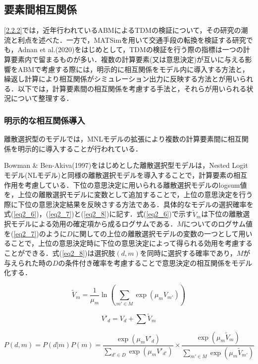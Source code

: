 \subsection{要素間相互関係}\label{2.2.3}

\ref{2.2.2}では，近年行われているABMによるTDMの検証について，その研究の潮流と利点を述べた．一方で，MATSimを用いて交通手段の転換を検証する研究でも，Adnan et al.(2020)をはじめとして，TDMの検証を行う際の指標は一つの計算要素内で留まるものが多い．複数の計算要素(又は意思決定)が互いに与える影響をABMで考慮する際には，明示的に相互関係をモデル内に導入する方法と，繰返し計算により相互関係がシミュレーション出力に反映する方法とが用いられる．以下では，計算要素間の相互関係を考慮する手法と，それらが用いられる状況について整理する．  

\subsubsection{明示的な相互関係導入}
離散選択型のモデルでは，MNLモデルの拡張により複数の計算要素間に相互関係を明示的に導入することが行われている．

Bowman \& Ben-Akiva(1997)をはじめとした離散選択型モデルは，Nested Logit モデル(NLモデル)と同様の離散選択モデルを導入することで，計算要素の相互作用を考慮している．下位の意思決定に用いられる離散選択モデルのlogsum値を，上位の離散選択モデルに変数として追加することで，上位の意思決定を行う際に下位の意思決定結果を反映さする方法である．具体的なモデルの選択確率を式(\ref{eq2_6})，(\ref{eq2_7})と(\ref{eq2_8})に記す．式(\ref{eq2_6})で示す$\tilde{V}_{m}$は下位の離散選択モデルによる効用の確定項から成るログサムである．$M$についてのログサム値を(\ref{eq2_7})のように$D$に関しての上位の離散選択モデルの変数の一つとして用いることで，上位の意思決定時に下位の意思決定によって得られる効用を考慮することができる．式(\ref{eq2_8})は選択肢$(d,m)$を同時に選択する確率であり，$M$が与えられた時の$D$の条件付き確率を考慮することで意思決定の相互関係をモデル化する．

\begin{equation} \label{eq2_6}
	\tilde{V}_{m} = \frac{1}{\mu_m} \ln \left( \sum_{m' \in M} \exp (\mu_m V_{m'}) \right)
\end{equation}

\begin{equation} \label{eq2_7}
	V'_d = V_d + \sum \tilde{V}_m
\end{equation}

\begin{equation} \label{eq2_8}
	P(d,m) = P(d|m)P(m) = \frac{\exp(\mu_m V'_d)}{\sum_{d' \in D} \exp(\mu_m V'_{d'})} \times \frac{\exp(\mu_m \tilde{V}_{m})}{\sum_{m' \in M} \exp(\mu_m \tilde{V}_{m'})}
\end{equation}

